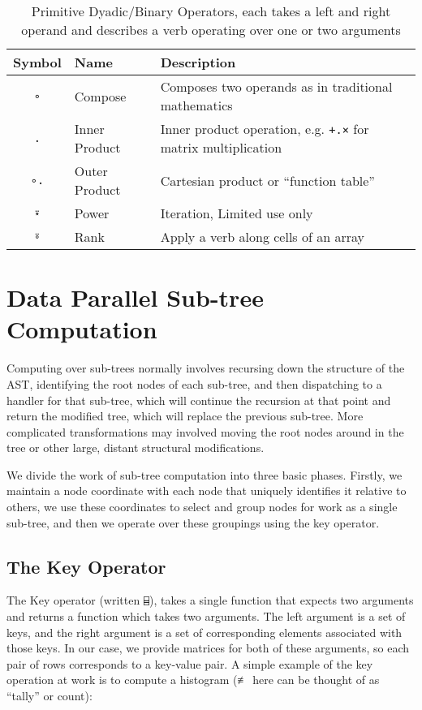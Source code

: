 \documentclass[numbers,preprint]{sigplanconf}
\begin{document}
\begin{table*}
\centering
\begin{tabular}{cll}
\toprule
Symbol     & Name & Description \\
\midrule
\texttt{∘} & Compose & Composes two operands as in traditional mathematics \\
\texttt{.} & Inner Product & Inner product operation, e.g.
 \texttt{+.×} for matrix multiplication \\
\texttt{∘.} & Outer Product & Cartesian product or ``function table'' \\
\texttt{⍣} & Power & Iteration, Limited use only \\
\texttt{⍤} & Rank & Apply a verb along cells of an array \\
\end{tabular}
\caption{Primitive Dyadic/Binary Operators, each takes a left
 and right operand and describes a verb operating over one or two arguments}
\label{tab:conjunctions}
\end{table*}

\section{Data Parallel Sub-tree Computation}

Computing over sub-trees normally involves recursing down the structure of 
the AST, identifying the root nodes of each sub-tree, and then dispatching
to a handler for that sub-tree, which will continue the recursion at that 
point and return the modified tree, which will replace the previous 
sub-tree. More complicated transformations may involved moving the root 
nodes around in the tree or other large, distant structural modifications. 

We divide the work of sub-tree computation into three basic phases. Firstly, 
we maintain a node coordinate with each node that uniquely identifies it 
relative to others, we use these coordinates to select and group nodes for 
work as a single sub-tree, and then we operate over these groupings using 
the key operator.

\subsection{The Key Operator}

The Key operator (written \verb;⌸;), takes a single function
that expects two arguments and returns a function which takes two
arguments. The left argument is a set of keys, and the right argument
is a set of corresponding elements associated with those keys. In our
case, we provide matrices for both of these arguments, so each pair
of rows corresponds to a key-value pair. A simple example of the key
operation at work is to compute a histogram (≢ here can be thought
of as “tally” or count):
\end{document}
